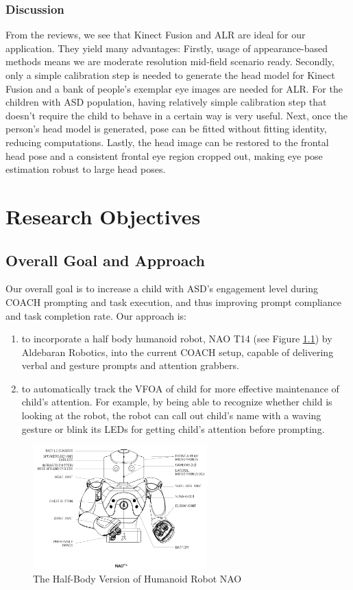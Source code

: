 \documentclass{ut-thesis}
\begin{document}
\subsection{Discussion}
From the reviews, we see that Kinect Fusion and ALR are ideal for our application.  They yield many advantages:  Firstly, usage of appearance-based methods means we are moderate resolution mid-field scenario ready.  Secondly, only a simple calibration step is needed to generate the head model for Kinect Fusion and a bank of people's exemplar eye images are needed for ALR.  For the children with ASD population, having relatively simple calibration step that doesn't require the child to behave in a certain way is very useful.  Next, once the person's head model is generated, pose can be fitted without fitting identity, reducing computations.  Lastly, the head image can be restored to the frontal head pose and a consistent frontal eye region cropped out, making eye pose estimation robust to large head poses.



\chapter{Research Objectives}

\section{Overall Goal and Approach}
Our overall goal is to increase a child with ASD's engagement level during COACH prompting and task execution, and thus improving prompt compliance and task completion rate.  Our approach is:
\begin{enumerate}
	\item to incorporate a half body humanoid robot, NAO T14 (see Figure \ref{fig:HalfBodyNAO}) by Aldebaran Robotics, into the current COACH setup, capable of delivering verbal and gesture prompts and attention grabbers.

	\item to automatically track the VFOA of child for more effective maintenance of child's attention.  For example, by being able to recognize whether child is looking at the robot, the robot can call out child's name with a waving gesture or blink its LEDs for getting child's attention before prompting.

\end{enumerate}
\begin{figure} [h]
	\centering
	\includegraphics[width=0.6\textwidth]{./img/nao_t14_schema}
	\caption{The Half-Body Version of Humanoid Robot NAO}
	\label{fig:HalfBodyNAO}
\end{figure}
\end{document}
